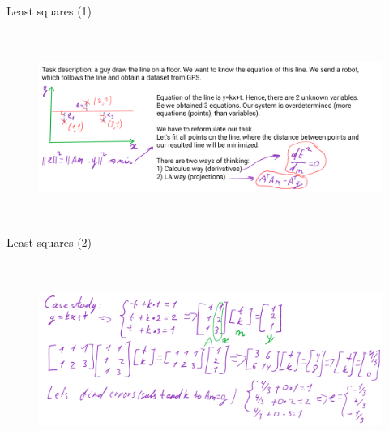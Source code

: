 \documentclass[aspectratio=169]{beamer}
\begin{document}
\begin{frame}[t]{Least squares (1)}
    \framesubtitle{}
    \begin{figure}[H]
        \centering\includegraphics[height=6cm,width=1\textwidth,keepaspectratio]{AGLA2_for_slides_5.png}
        \label{fig:AGLA2_for_slides_5.png}
    \end{figure}
\end{frame}

\begin{frame}[t]{Least squares (2)}
    \framesubtitle{}
    \begin{figure}[H]
        \centering\includegraphics[height=6cm,width=1\textwidth,keepaspectratio]{AGLA2_for_slides_6.png}
        \label{fig:AGLA2_for_slides_6.png}
    \end{figure}
\end{frame}
\end{document}
